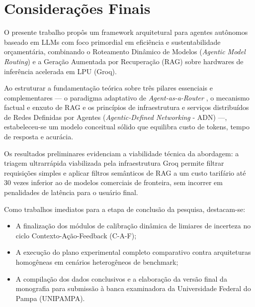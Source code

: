 \chapter{Considerações Finais}\label{conclusao}

O presente trabalho propôs um framework arquitetural para agentes autônomos baseado em LLMs com foco primordial em eficiência e sustentabilidade orçamentária, combinando o Roteamento Dinâmico de Modelos (\textit{Agentic Model Routing}) e a Geração Aumentada por Recuperação (RAG) sobre hardwares de inferência acelerada em LPU (Groq).

Ao estruturar a fundamentação teórica sobre três pilares essenciais e complementares --- o paradigma adaptativo de \textit{Agent-as-a-Router} \cite{lance2026agentasrouter}, o mecanismo factual e enxuto de RAG \cite{lewis2020retrieval} e os princípios de infraestrutura e serviços distribuídos de Redes Definidas por Agentes (\textit{Agentic-Defined Networking} - ADN) \cite{rossi2026adn} ---, estabeleceu-se um modelo conceitual sólido que equilibra custo de tokens, tempo de resposta e acurácia.

Os resultados preliminares evidenciam a viabilidade técnica da abordagem: a triagem ultrarrápida viabilizada pela infraestrutura Groq permite filtrar requisições simples e aplicar filtros semânticos de RAG a um custo tarifário até 30 vezes inferior ao de modelos comerciais de fronteira, sem incorrer em penalidades de latência para o usuário final.

Como trabalhos imediatos para a etapa de conclusão da pesquisa, destacam-se:

\begin{itemize}
    \item A finalização dos módulos de calibração dinâmica de limiares de incerteza no ciclo Contexto-Ação-Feedback (C-A-F);
    \item A execução do plano experimental completo comparativo contra arquiteturas homogêneas em cenários heterogêneos de benchmark;
    \item A compilação dos dados conclusivos e a elaboração da versão final da monografia para submissão à banca examinadora da Universidade Federal do Pampa (UNIPAMPA).
\end{itemize}
